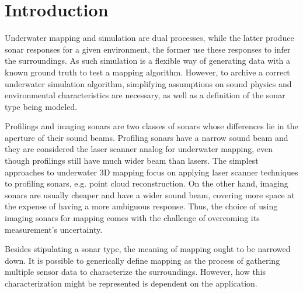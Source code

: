 \chapter{Introduction}


Underwater mapping and simulation are dual processes, while the latter produce
sonar responses for a given environment, the former use these responses to infer
the surroundings. As such simulation is a flexible way of generating data with a
known ground truth to test a mapping algorithm. However, to archive a correct
underwater simulation algorithm, simplifying assumptions on sound physics
and environmental characteristics are necessary, as well as a definition of the
sonar type being modeled.

Profilings and imaging sonars are two classes of sonars whose differences lie
in the aperture of their sound beams. Profiling sonars have a narrow sound beam
and they are considered the laser scanner analog for underwater mapping,
even though profilings still have much wider beam than lasers. The simplest
approaches to underwater 3D mapping focus on applying laser scanner techniques
to profiling sonars, e.g. point cloud reconstruction.
 On the other hand, imaging sonars are usually
cheaper and have a wider sound beam, covering more space at the expense of
having a more ambiguous response. Thus, the choice of using imaging
sonars for mapping comes with the challenge of overcoming its measurement's
uncertainty.



Besides stipulating a sonar type, the meaning of mapping ought to be narrowed
down. It is possible to generically define mapping as the process of gathering
multiple sensor data to characterize the surroundings. However, how this
characterization might be represented is dependent on the application.

